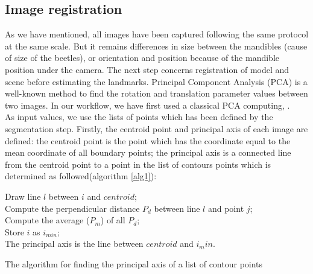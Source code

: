 \documentclass[twoside,twocolumn,10pt]{article}
\begin{document}
\subsection{Image registration}
As we have mentioned, all images have been captured following the same protocol at the same scale. But it remains differences in size between the mandibles (cause of size of the beetles), or orientation and position because of the mandible position under the camera. The next step concerns registration of model and scene before estimating the landmarks. Principal Component Analysis (PCA) is a well-known method to find the rotation and translation parameter values between two images. In our workflow, we have first used a classical PCA computing\cite{bsspca}, \cite{shlens2014tutorial}.\\
As input values, we use the lists of points which has been defined by the segmentation step. Firstly, the centroid point and principal axis of each image are defined: the centroid point is the point which has the coordinate equal to the mean coordinate of all boundary points; the principal axis is a connected line from the centroid point to a point in the list of contours points which is determined as followed(algorithm \ref{alg1}):
\begin{algorithm}
	{
		Draw line $l$ between $i$ and $centroid$;\\
		{
			{
				Compute the perpendicular distance $P_d$ between line $l$ and point $j$;\\
			}		
		}
		Compute the average ($P_m$) of all $P_d$;\\
		{
			Store $i$ as $i_{min}$;\\
		}
	}
	The principal axis is the line between $centroid$ and $i_min$.
	\caption{The algorithm for finding the principal axis of a list of contour points}
	\label{alg1}
\end{algorithm}\\
\end{document}
